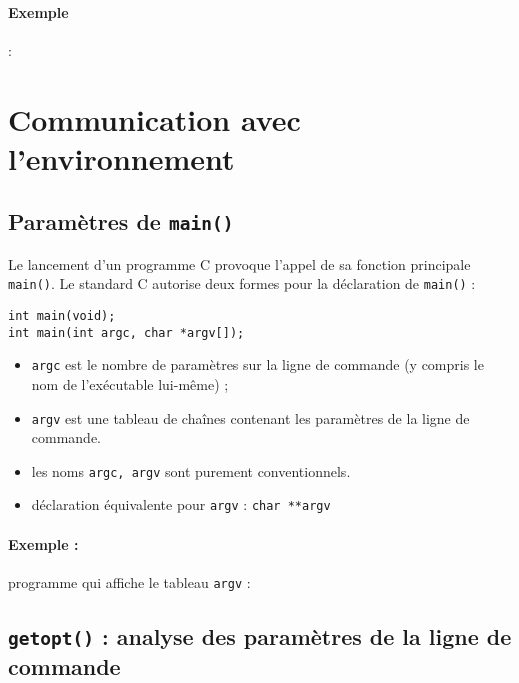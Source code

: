 \paragraph*{Exemple} :


\source
%



\section{Communication avec l'environnement}

\subsection{Paramètres de \texttt{main()}}

Le lancement d'un programme C provoque
l'appel de sa fonction principale \texttt{main()}.
Le standard C autorise deux formes pour la déclaration
de \texttt{main()} :

 
\extrait
\begin{lstlisting}
int main(void);
int main(int argc, char *argv[]);   
\end{lstlisting}

\begin{itemize}
\item \texttt{argc}  est le nombre de paramètres sur la ligne de commande
(y compris le nom de l'exécutable lui-même) ;
\item \texttt{argv} est une tableau de chaînes contenant les
  paramètres de la ligne de commande.
  \item les noms \texttt{argc, argv} sont purement conventionnels.
  \item déclaration équivalente pour \texttt{argv}  : \verb+char **argv+
\end{itemize}

\paragraph*{Exemple :} programme qui affiche le tableau \texttt{argv} :


\source




\subsection{\texttt{getopt()} : analyse des paramètres de la ligne de commande}

